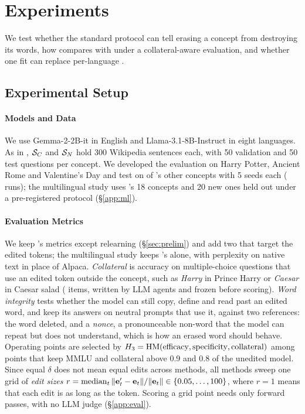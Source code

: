 \section{Experiments}
\label{sec:experiments}

We test whether the standard protocol can tell erasing a concept from destroying its words, how \cinder{} compares with \ember{} under a collateral-aware evaluation, and whether one \cinder{} fit can replace per-language \ember{}.

\subsection{Experimental Setup}
\label{sec:setup}

\paragraph{Models and Data}
We use Gemma-2-2B-it \citep{gemma2024gemma2} in English and Llama-3.1-8B-Instruct \citep{grattafiori2024llama3} in eight languages.
As in \ember{}, $\mathcal{S}_C$ and $\mathcal{S}_N$ hold 300 Wikipedia sentences each, with 50 validation and 50 test questions per concept.
We developed the evaluation on Harry Potter, Ancient Rome and Valentine's Day and test on  of \ember{}'s other concepts with 5 seeds each ( runs); the multilingual study uses \ember{}'s 18 concepts and 20 new ones held out under a pre-registered protocol (\S\ref{app:ml}).

\paragraph{Evaluation Metrics}
We keep \ember{}'s metrics except relearning (\S\ref{sec:prelim}) and add two that target the edited tokens; the multilingual study keeps \ember{}'s alone, with perplexity on native text in place of Alpaca.
\emph{Collateral} is accuracy on multiple-choice questions that use an edited token outside the concept, such as \emph{Harry} in Prince Harry or \emph{Caesar} in Caesar salad ( items, written by LLM agents and frozen before scoring).
\emph{Word integrity} tests whether the model can still copy, define and read past an edited word, and keep its answers on neutral prompts that use it, against two references: the word deleted, and a \emph{nonce}, a pronounceable non-word that the model can repeat but does not understand, which is how an erased word should behave.
Operating points are selected by $H_{3} = \operatorname{HM}(\text{efficacy}, \text{specificity}, \text{collateral})$ among points that keep MMLU and collateral above 0.9 and 0.8 of the unedited model.
Since equal $\delta$ does not mean equal edits across methods, all methods sweep one grid of \emph{edit sizes} $r = \operatorname{median}_t \|\mathbf{e}_t' - \mathbf{e}_t\| / \|\mathbf{e}_t\| \in \{0.05, \dots, 100\}$, where $r = 1$ means that each edit is as long as the token.
Scoring a grid point needs only forward passes, with no LLM judge (\S\ref{app:eval}).

